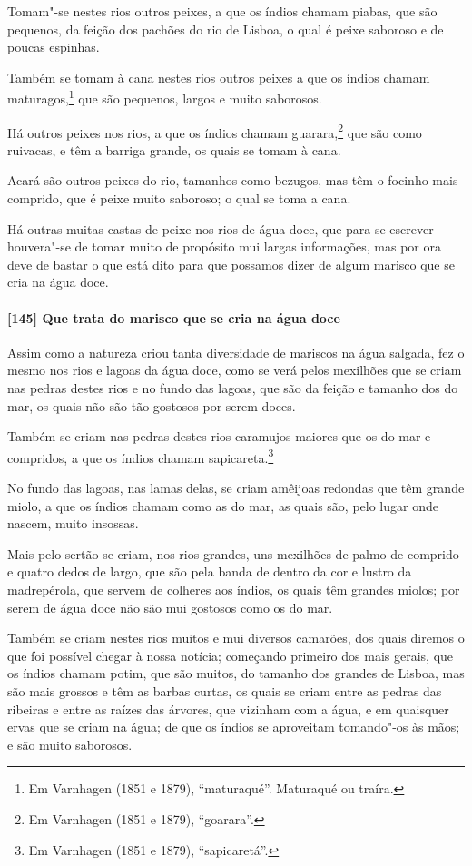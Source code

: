 Tomam"-se nestes rios outros peixes, a que os índios chamam piabas, que são pequenos, da
feição dos pachões do rio de Lisboa, o qual é peixe saboroso e de poucas espinhas.

Também se tomam à cana nestes rios outros peixes a que os índios chamam
maturagos,\footnote{ Em Varnhagen (1851 e 1879), ``maturaqué''. Maturaqué ou traíra.} que
são pequenos, largos e muito saborosos.

Há outros peixes nos rios, a que os índios chamam guarara,\footnote{ Em Varnhagen (1851 e
1879), ``goarara''.} que são como ruivacas, e têm a barriga grande, os quais se tomam à
cana.

Acará são outros peixes do rio, tamanhos como bezugos, mas têm o focinho mais comprido,
que é peixe muito saboroso; o qual se toma a cana.

Há outras muitas castas de peixe nos rios de água doce, que para se escrever houvera"-se de
tomar muito de propósito mui largas informações, mas por ora deve de bastar o que está
dito para que possamos dizer de algum marisco que se cria na água doce.

\paragraph{[145] Que trata do marisco que se cria na água doce}\quad
Assim como a natureza criou tanta diversidade de mariscos na água salgada, fez o mesmo nos
rios e lagoas da água doce, como se verá pelos mexilhões que se criam nas pedras destes
rios e no fundo das lagoas, que são da feição e tamanho dos do mar, os quais não são tão
gostosos por serem doces.

Também se criam nas pedras destes rios caramujos maiores que os do mar e compridos, a que
os índios chamam sapicareta.\footnote{ Em Varnhagen (1851 e 1879), ``sapicaretá''.}

No fundo das lagoas, nas lamas delas, se criam amêijoas redondas que têm grande miolo, a
que os índios chamam como as do mar, as quais são, pelo lugar onde nascem, muito insossas.

Mais pelo sertão se criam, nos rios grandes, uns mexilhões de palmo de comprido e quatro
dedos de largo, que são pela banda de dentro da cor e lustro da madrepérola, que servem de
colheres aos índios, os quais têm grandes miolos; por serem de água doce não são mui
gostosos como os do mar.

Também se criam nestes rios muitos e mui diversos camarões, dos quais diremos o que foi
possível chegar à nossa notícia; começando primeiro dos mais gerais, que os índios chamam
potim, que são muitos, do tamanho dos grandes de Lisboa, mas são mais grossos e têm as
barbas curtas, os quais se criam entre as pedras das ribeiras e entre as raízes das
árvores, que vizinham com a água, e em quaisquer ervas que se criam na água; de que os
índios se aproveitam tomando"-os às mãos; e são muito saborosos.

